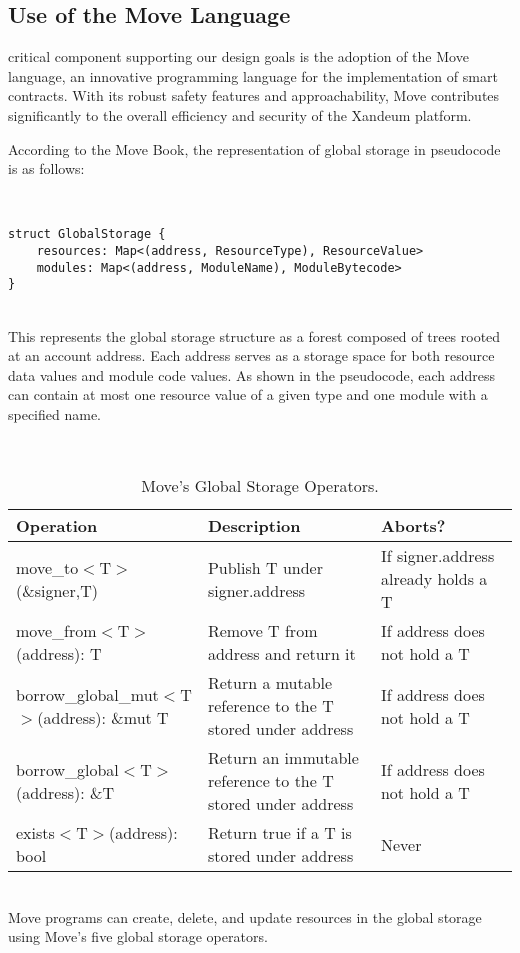 \documentclass[11pt]{article}   	%
\begin{document}
\subsection{Use of the Move Language}
 critical component supporting our design goals is the adoption of the Move language, an innovative programming language for the implementation of smart contracts. With its robust safety features and approachability, Move contributes significantly to the overall efficiency and security of the Xandeum platform.

According to the Move Book, the representation of global storage in pseudocode is as follows:

\ \\
\begin{lstlisting}[caption=Global Storage in Move]
struct GlobalStorage {
    resources: Map<(address, ResourceType), ResourceValue>
    modules: Map<(address, ModuleName), ModuleBytecode>
}
\end{lstlisting}
\ \\

This represents the global storage structure as a forest composed of trees rooted at an account address. Each address serves as a storage space for both resource data values and module code values. As shown in the pseudocode, each address can contain at most one resource value of a given type and one module with a specified name.

\ \\
\phantom{~}
\begin{table}[!h]
\begin{center}
\begin{tabular}{p{}p{}p{}}
\hline
\textbf{Operation} & \textbf{Description} & \textbf{Aborts?} \\ \hline
move\_to$<$T$>$(\&signer,T) & Publish T under signer.address & If signer.address already holds a T \\ \hline
move\_from$<$T$>$(address): T & Remove T from address and return it & If address does not hold a T \\ \hline
borrow\_global\_mut$<$T$>$(address): \&mut T & Return a mutable reference to the T stored under address & If address does not hold a T \\ \hline
borrow\_global$<$T$>$(address): \&T & Return an immutable reference to the T stored under address & If address does not hold a T \\ \hline
exists$<$T$>$(address): bool & Return true if a T is stored under address & Never \\ \hline
\end{tabular}
\caption{\label{movesto}Move's Global Storage Operators.}
\end{center}
\end{table}
\ \\
Move programs can create, delete, and update resources in the global storage using Move's five global storage operators.
\end{document}
